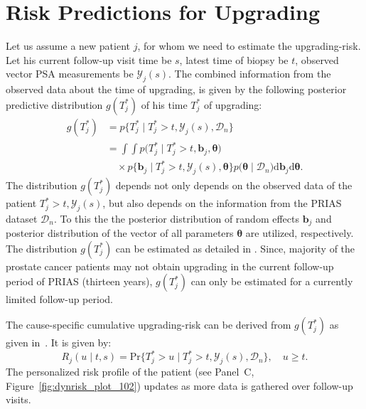 \section{Risk Predictions for Upgrading}
\label{sec:param_estimates_jm_fit_prias}
Let us assume a new patient $j$, for whom we need to estimate the upgrading-risk. Let his current follow-up visit time be $s$, latest time of biopsy be $t$, observed vector PSA measurements be $\mathcal{Y}_{j}(s)$. The combined information from the observed data about the time of upgrading, is given by the following posterior predictive distribution $g(T^*_j)$ of his time $T^*_j$ of upgrading:
\begin{equation*}
\label{eq:post_pred_dist}
\begin{aligned}
g(T^*_j) &= p\big\{T^*_j \mid T^*_j > t, \mathcal{Y}_{j}(s), \mathcal{D}_n\big\}\\
&= \int \int p\big(T^*_j \mid T^*_j > t, \boldsymbol{b}_j, \boldsymbol{\theta}\big)\\
& \quad \times p\big\{\boldsymbol{b}_j \mid T^*_j>t, \mathcal{Y}_{j}(s), \boldsymbol{\theta}\big\}p\big(\boldsymbol{\theta} \mid \mathcal{D}_n\big) \mathrm{d} \boldsymbol{b}_j \mathrm{d} \boldsymbol{\theta}.
\end{aligned}
\end{equation*}
The distribution $g(T^*_j)$ depends not only depends on the observed data of the patient $T^*_j > t, \mathcal{Y}_{j}(s)$, but also depends on the information from the PRIAS dataset $\mathcal{D}_n$. To this the the posterior distribution of random effects $\boldsymbol{b}_j$ and posterior distribution of the vector of all parameters $\boldsymbol{\theta}$ are utilized, respectively. The distribution $g(T^*_j)$ can be estimated as detailed in \citet{rizopoulos2017dynamic}. Since, majority of the prostate cancer patients may not obtain upgrading in the current follow-up period of PRIAS (thirteen years), $g(T^*_j)$ can only be estimated for a currently limited follow-up period.

The cause-specific cumulative upgrading-risk can be derived from $g(T^*_j)$ as given in~\citep{rizopoulos2017dynamic}. It is given by:
\begin{equation}
\label{eq:dynamic_risk_prob}
R_j(u \mid t,s) = \mbox{Pr}\big\{T^*_j > u \mid T^*_j > t, \mathcal{Y}_{j}(s), \mathcal{D}_n\big\}, \quad u \geq t.
\end{equation}
The personalized risk profile of the patient (see Panel~C, Figure~\ref{fig:dynrisk_plot_102}) updates as more data is gathered over follow-up visits. 

